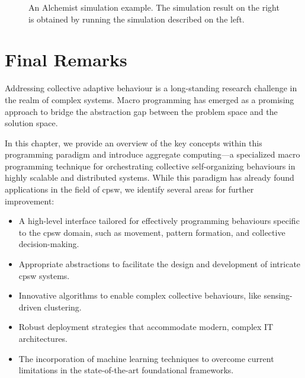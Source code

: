 \begin{figure}
\begin{subfigure}[b]{0.49\textwidth}
\end{subfigure}
\caption[An Alchemist simulation example]{An Alchemist simulation example. 
    The simulation result on the right is obtained 
    by running the simulation described on the left.
    }
\label{coordination2023:fig:alchemist}
\end{figure}

\section{Final Remarks}
Addressing collective adaptive behaviour is a long-standing research challenge in the realm of complex systems. 
 Macro programming has emerged as a promising approach to bridge the abstraction gap between the problem space and the solution space. 

In this chapter, 
 we provide an overview of the key concepts within this programming paradigm and introduce aggregate computing---a specialized macro programming technique for orchestrating collective self-organizing behaviours in highly scalable and distributed systems. 
 While this paradigm has already found applications in the field of \ac{cpsw}, 
 we identify several areas for further improvement:
\begin{itemize}
    \item A high-level interface tailored for effectively programming behaviours specific to the \ac{cpsw} domain, such as movement, pattern formation, and collective decision-making.
    \item Appropriate abstractions to facilitate the design and development of intricate \ac{cpsw} systems.
    \item Innovative algorithms to enable complex collective behaviours, like sensing-driven clustering.
    \item Robust deployment strategies that accommodate modern, complex IT architectures.
    \item The incorporation of machine learning techniques to overcome current limitations in the state-of-the-art foundational frameworks.
\end{itemize}

